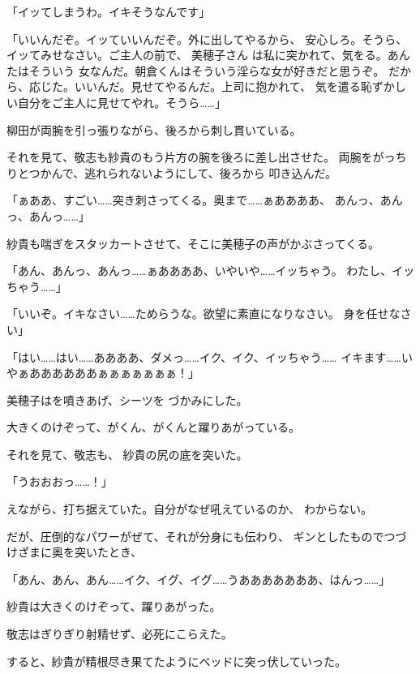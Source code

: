 ﻿\documentclass[
    book,tate,
    line_length=30zw,
    jafontsize=12pt,
    paper=b5j,
    landscape,
    ]{jlreq}
\begin{document}
「イッてしまうわ。イキそうなんです」

「いいんだぞ。イッていいんだぞ。外に出してやるから、
安心しろ。そうら、イッてみせなさい。ご主人の前で、
美穂子さん は私に突かれて、気をる。あんたはそういう
女なんだ。朝倉くんはそういう淫らな女が好きだと思うぞ。
だから、応じた。いいんだ。見せてやるんだ。上司に抱かれて、
気を遣る恥ずかしい自分をご主人に見せてやれ。そうら……」

柳田が両腕を引っ張りながら、後ろから刺し貫いている。

それを見て、敬志も紗貴のもう片方の腕を後ろに差し出させた。
両腕をがっちりとつかんで、逃れられないようにして、後ろから
叩き込んだ。

「ぁああ、すごい……突き刺さってくる。奥まで……ぁああああ、
あんっ、あんっ、あんっ……」

紗貴も喘ぎをスタッカートさせて、そこに美穂子の声がかぶさってくる。

「あん、あんっ、あんっ……ぁああああ、いやいや……イッちゃう。
わたし、イッちゃう……」

「いいぞ。イキなさい……ためらうな。欲望に素直になりなさい。
身を任せなさい」

「はい……はい……ああああ、ダメっ……イク、イク、イッちゃう……
イキます……いやぁああああああぁぁぁぁぁぁぁ！」

美穂子はを噴きあげ、シーツを
づかみにした。

大きくのけぞって、がくん、がくんと躍りあがっている。

それを見て、敬志も、
紗貴の尻の底を突いた。

「うおおおっ……！」

えながら、打ち据えていた。自分がなぜ吼えているのか、
わからない。

だが、圧倒的なパワーがぜて、それが分身にも伝わり、
ギンとしたものでつづけざまに奥を突いたとき、

「あん、あん、あん……イク、イグ、イグ……うあああああああ、はんっ……」

紗貴は大きくのけぞって、躍りあがった。

敬志はぎりぎり射精せず、必死にこらえた。

すると、紗貴が精根尽き果てたようにベッドに突っ伏していった。

\section*{}
\end{document}
